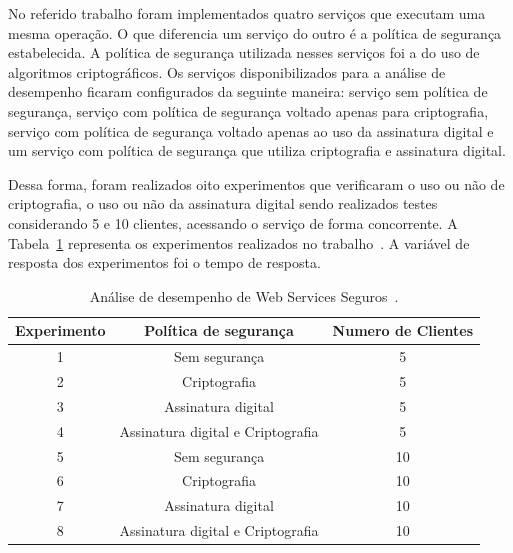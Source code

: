 No referido trabalho foram implementados quatro serviços que executam uma mesma operação. O que diferencia um serviço do outro é a política de segurança estabelecida. A política de segurança utilizada nesses serviços foi a do uso de algoritmos criptográficos. Os serviços disponibilizados para a análise de desempenho ficaram configurados da seguinte maneira: serviço sem política de segurança, serviço com política de segurança voltado apenas para criptografia, serviço com política de segurança voltado apenas ao uso da assinatura digital e um serviço com política de segurança que utiliza criptografia e assinatura digital.

Dessa forma, foram realizados oito experimentos que verificaram o uso ou não de criptografia, o uso ou não da assinatura digital sendo realizados testes considerando 5 e 10 clientes, acessando o serviço de forma concorrente. A Tabela~\ref{tb:expWSSecurity} representa os experimentos realizados no trabalho~\cite{rodrigues2011analysis}. A variável de resposta dos experimentos foi o tempo de resposta.

\begin{table}[h]
\begin{center}
\begin{tabular}{|c|c|c|}
\hline
\textbf{Experimento} & \textbf{Política de segurança}     & \textbf{Numero de Clientes} \\ \hline
1                    & Sem segurança                      & 5                           \\ \hline
2                    & Criptografia                       & 5                           \\ \hline
3                    & Assinatura digital                 & 5                           \\ \hline
4                    & Assinatura digital e Criptografia  & 5                           \\ \hline
5                    & Sem segurança                      & 10                           \\ \hline
6                    & Criptografia                       & 10                           \\ \hline
7                    & Assinatura digital                 & 10                           \\ \hline
8                    & Assinatura digital e Criptografia  & 10                          \\ \hline
\end{tabular}\caption {Análise de desempenho de Web Services Seguros~\cite{rodrigues2011analysis}.}\label{tb:expWSSecurity}
\end{center}
\end{table}

